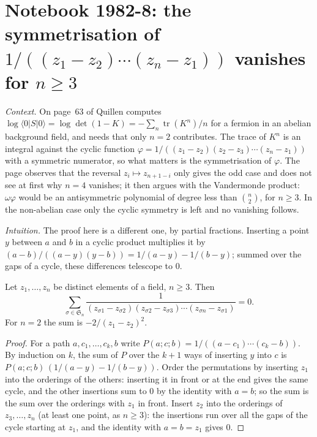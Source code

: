 \section[Notebook 1982-8: the symmetrised cyclic products vanish]{Notebook 1982-8: the symmetrisation of $1/((z_1 - z_2)\cdots(z_n - z_1))$ vanishes for $n \ge 3$\protect{}}\label{sec:quillen-1982-8}

\emph{Context.} On page~63 of  Quillen computes $\log\langle 0|S|0\rangle = \log\det(1 - K) = -\sum_n \operatorname{tr}(K^n)/n$ for a fermion in an abelian background field, and needs that only $n = 2$ contributes. The trace of $K^n$ is an integral against the cyclic function $\varphi = 1/((z_1 - z_2)(z_2 - z_3)\cdots(z_n - z_1))$ with a symmetric numerator, so what matters is the symmetrisation of $\varphi$. The page observes that the reversal $z_i \mapsto z_{n+1-i}$ only gives the odd case and does not see at first why $n = 4$ vanishes; it then argues with the Vandermonde product: $\omega\varphi$ would be an antisymmetric polynomial of degree less than $\binom n2$, for $n \ge 3$. In the non-abelian case only the cyclic symmetry is left and no vanishing follows.

\emph{Intuition.} The proof here is a different one, by partial fractions. Inserting a point $y$ between $a$ and $b$ in a cyclic product multiplies it by $(a - b)/((a - y)(y - b)) = 1/(a - y) - 1/(b - y)$; summed over the gaps of a cycle, these differences telescope to $0$.

\begin{encadre}
\begin{theoreme}\label{thm:quillen-1982-8}
Let $z_1, \ldots, z_n$ be distinct elements of a field, $n \ge 3$. Then
\[
\sum_{\sigma \in \mathfrak S_n} \frac{1}{(z_{\sigma 1} - z_{\sigma 2})(z_{\sigma 2} - z_{\sigma 3})\cdots(z_{\sigma n} - z_{\sigma 1})} = 0.
\]
For $n = 2$ the sum is $-2/(z_1 - z_2)^2$.
\end{theoreme}
\end{encadre}

\begin{proof}
For a path $a, c_1, \ldots, c_k, b$ write $P(a; c; b) = 1/((a - c_1)\cdots(c_k - b))$. By induction on $k$, the sum of $P$ over the $k + 1$ ways of inserting $y$ into $c$ is $P(a; c; b)\,(1/(a - y) - 1/(b - y))$. Order the permutations by inserting $z_1$ into the orderings of the others: inserting it in front or at the end gives the same cycle, and the other insertions sum to $0$ by the identity with $a = b$; so the sum is the sum over the orderings with $z_1$ in front. Insert $z_2$ into the orderings of $z_3, \ldots, z_n$ (at least one point, as $n \ge 3$): the insertions run over all the gaps of the cycle starting at $z_1$, and the identity with $a = b = z_1$ gives $0$.
\end{proof}

